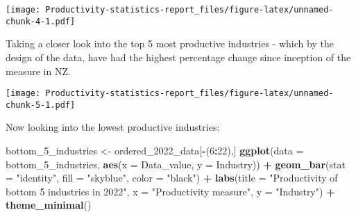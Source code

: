 \documentclass[
]{article}
\newenvironment{Shaded}{\begin{snugshade}}{\end{snugshade}}
\newcommand{\AttributeTok}[1]{\textcolor[rgb]{0.13,0.29,0.53}{#1}}
\newcommand{\DecValTok}[1]{\textcolor[rgb]{0.00,0.00,0.81}{#1}}
\newcommand{\FunctionTok}[1]{\textcolor[rgb]{0.13,0.29,0.53}{\textbf{#1}}}
\newcommand{\NormalTok}[1]{#1}
\newcommand{\OtherTok}[1]{\textcolor[rgb]{0.56,0.35,0.01}{#1}}
\newcommand{\SpecialCharTok}[1]{\textcolor[rgb]{0.81,0.36,0.00}{\textbf{#1}}}
\newcommand{\StringTok}[1]{\textcolor[rgb]{0.31,0.60,0.02}{#1}}
\begin{document}
\texttt{[image: Productivity-statistics-report\_files/figure-latex/unnamed-chunk-4-1.pdf]}

Taking a closer look into the top 5 most productive industries - which
by the design of the data, have had the highest percentage change since
inception of the measure in NZ.

\begin{Shaded}
\end{Shaded}

\texttt{[image: Productivity-statistics-report\_files/figure-latex/unnamed-chunk-5-1.pdf]}

Now looking into the lowest productive industries:

\begin{Shaded}
\begin{Highlighting}[]
\NormalTok{bottom\_5\_industries }\OtherTok{\textless{}{-}}\NormalTok{ ordered\_2022\_data[}\SpecialCharTok{{-}}\NormalTok{(}\DecValTok{6}\SpecialCharTok{:}\DecValTok{22}\NormalTok{),]}
\FunctionTok{ggplot}\NormalTok{(}\AttributeTok{data =}\NormalTok{ bottom\_5\_industries, }\FunctionTok{aes}\NormalTok{(}\AttributeTok{x =}\NormalTok{ Data\_value, }\AttributeTok{y =}\NormalTok{ Industry)) }\SpecialCharTok{+}
  \FunctionTok{geom\_bar}\NormalTok{(}\AttributeTok{stat =} \StringTok{"identity"}\NormalTok{, }\AttributeTok{fill =} \StringTok{"skyblue"}\NormalTok{, }\AttributeTok{color =} \StringTok{"black"}\NormalTok{) }\SpecialCharTok{+}
  \FunctionTok{labs}\NormalTok{(}\AttributeTok{title =} \StringTok{"Productivity of bottom 5 industries in 2022"}\NormalTok{, }\AttributeTok{x =} \StringTok{"Productivity measure"}\NormalTok{, }\AttributeTok{y =} \StringTok{"Industry"}\NormalTok{) }\SpecialCharTok{+}
  \FunctionTok{theme\_minimal}\NormalTok{()}
\end{Highlighting}
\end{Shaded}
\end{document}
